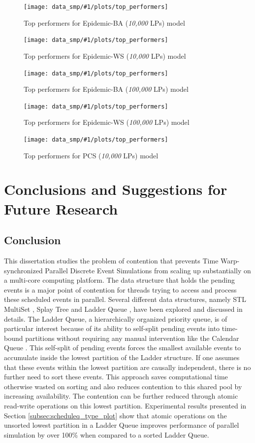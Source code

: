 \documentclass[11pt]{book}
\newcommand{\plotOverallSMP}[3]{
\begin{figure}
  \centerline{\texttt{[image: data\_smp/\#1/plots/top\_performers]}}
  \caption{#2}\label{#3}
\end{figure}
}
\begin{document}
\plotOverallSMP{epidemic_10k_ba}
               {Top performers for Epidemic-BA (\emph{10,000} LPs) model}
               {plot:epidemic_10k_ba:consolidated_smp}

\plotOverallSMP{epidemic_10k_ws}
               {Top performers for Epidemic-WS (\emph{10,000} LPs) model}
               {plot:epidemic_10k_ws:consolidated_smp}

\plotOverallSMP{epidemic_100k_ba}
               {Top performers for Epidemic-BA (\emph{100,000} LPs) model}
               {plot:epidemic_100k_ba:consolidated_smp}

\plotOverallSMP{epidemic_100k_ws}
               {Top performers for Epidemic-WS (\emph{100,000} LPs) model}
               {plot:epidemic_100k_ws:consolidated_smp}

\plotOverallSMP{pcs_10k}
               {Top performers for PCS (\emph{10,000} LPs) model}
               {plot:pcs_10k:consolidated_smp}


\chapter[Conclusion and Future Research]{Conclusions and Suggestions for Future Research}
\label{chapter:conclude}

\section{Conclusion}

This dissertation studies the problem of contention that prevents Time Warp-synchronized Parallel Discrete
Event Simulations from scaling up substantially on a multi-core computing platform.  The data structure that
holds the pending events is a major point of contention for threads trying to access and process these
scheduled events in parallel.  Several different data structures, namely STL MultiSet \cite{musser-89}, Splay
Tree \cite{sleator-85} and Ladder Queue \cite{tang-05}, have been explored and discussed in details.  The
Ladder Queue, a hierarchically organized priority queue, is of particular interest because of its ability to
self-split pending events into time-bound partitions without requiring any manual intervention like the
Calendar Queue \cite{brown-88}.  This self-split of pending events forces the smallest available events to
accumulate inside the lowest partition of the Ladder structure.  If one assumes that these events within the
lowest partition are causally independent, there is no further need to sort these events.  This approach saves
computational time otherwise wasted on sorting and also reduces contention to this shared pool by increasing
availability.  The contention can be further reduced through atomic read-write operations on this lowest
partition.  Experimental results presented in Section \ref{subsec:scheduleq_type_plot} show that atomic
operations on the unsorted lowest partition in a Ladder Queue improves performance of parallel simulation by
over 100\% when compared to a sorted Ladder Queue.
\end{document}
